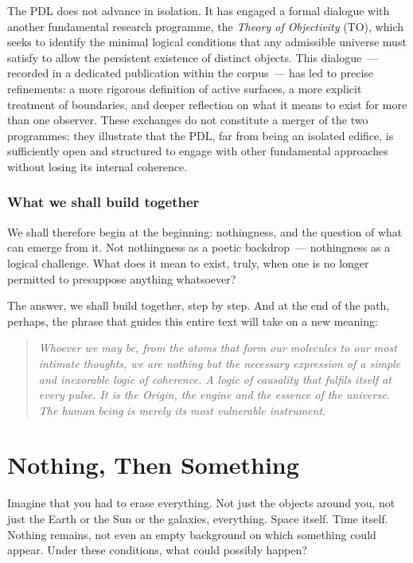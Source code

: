 \documentclass[12pt, a4paper, openright]{book}
\begin{document}
The PDL does not advance in isolation. It has engaged a formal dialogue with another fundamental research programme, the \emph{Theory of Objectivity} (TO), which seeks to identify the minimal logical conditions that any admissible universe must satisfy to allow the persistent existence of distinct objects. This dialogue~--- recorded in a dedicated publication within the corpus~--- has led to precise refinements: a more rigorous definition of active surfaces, a more explicit treatment of boundaries, and deeper reflection on what it means to exist for more than one observer. These exchanges do not constitute a merger of the two programmes; they illustrate that the PDL, far from being an isolated edifice, is sufficiently open and structured to engage with other fundamental approaches without losing its internal coherence.

\subsection*{What we shall build together}

We shall therefore begin at the beginning: nothingness, and the question of what can emerge from it. Not nothingness as a poetic backdrop~--- nothingness as a logical challenge. What does it mean to exist, truly, when one is no longer permitted to presuppose anything whatsoever?

\medskip

The answer, we shall build together, step by step. And at the end of the path, perhaps, the phrase that guides this entire text will take on a new meaning:

\begin{quote}
\itshape Whoever we may be, from the atoms that form our molecules to our most intimate thoughts, we are nothing but the necessary expression of a simple and inexorable logic of coherence. A logic of causality that fulfils itself at every pulse. It is the Origin, the engine and the essence of the universe. The human being is merely its most vulnerable instrument.
\end{quote}

\chapter{Nothing, Then Something}

Imagine that you had to erase everything. Not just the objects around you, not just the Earth or the Sun or the galaxies, everything. Space itself. Time itself. Nothing remains, not even an empty background on which something could appear. Under these conditions, what could possibly happen?
\end{document}
